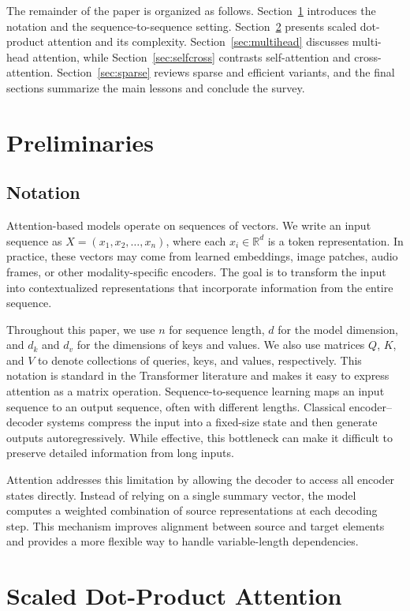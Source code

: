 \documentclass[a4paper,11pt]{article}
\begin{document}
The remainder of the paper is organized as follows. Section~\ref{sec:preliminaries} introduces the notation and the sequence-to-sequence setting. Section~\ref{sec:scaled} presents scaled dot-product attention and its complexity. Section~\ref{sec:multihead} discusses multi-head attention, while Section~\ref{sec:selfcross} contrasts self-attention and cross-attention. Section~\ref{sec:sparse} reviews sparse and efficient variants, and the final sections summarize the main lessons and conclude the survey.
\section{Preliminaries}\label{sec:preliminaries}
\subsection{Notation}

Attention-based models operate on sequences of vectors. We write an input sequence as $X = (x_1, x_2, \dots, x_n)$, where each $x_i \in \mathbb{R}^d$ is a token representation. In practice, these vectors may come from learned embeddings, image patches, audio frames, or other modality-specific encoders. The goal is to transform the input into contextualized representations that incorporate information from the entire sequence.

Throughout this paper, we use $n$ for sequence length, $d$ for the model dimension, and $d_k$ and $d_v$ for the dimensions of keys and values. We also use matrices $Q$, $K$, and $V$ to denote collections of queries, keys, and values, respectively. This notation is standard in the Transformer literature and makes it easy to express attention as a matrix operation.
Sequence-to-sequence learning maps an input sequence to an output sequence, often with different lengths. Classical encoder--decoder systems compress the input into a fixed-size state and then generate outputs autoregressively. While effective, this bottleneck can make it difficult to preserve detailed information from long inputs.

Attention addresses this limitation by allowing the decoder to access all encoder states directly. Instead of relying on a single summary vector, the model computes a weighted combination of source representations at each decoding step. This mechanism improves alignment between source and target elements and provides a more flexible way to handle variable-length dependencies.
\section{Scaled Dot-Product Attention}\label{sec:scaled}
\end{document}
